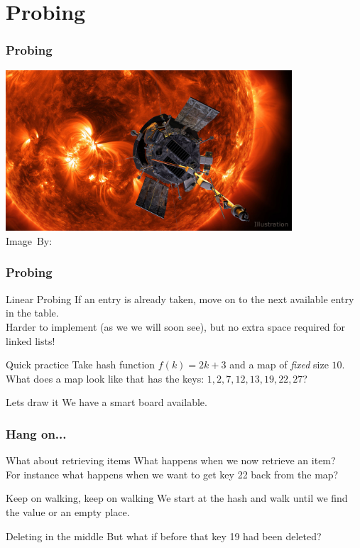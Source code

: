 \section{Probing}%
\label{sec:probing}

\begin{frame}
	\frametitle{Probing}
	\begin{center}
		\includegraphics[width=0.8\textwidth]{figures/probe.jpg}\\
		\hspace*{15pt}\hbox{\scriptsize Image By:}
	\end{center}
\end{frame}

\begin{frame}
	\frametitle{Probing}
		\begin{block}{Linear Probing}
			If an entry is already taken, move on to the next available entry in the table.\\
			Harder to implement (as we we will soon see), but no extra space required for linked lists!
		\end{block}	
		\pause
		\begin{questionblock}{Quick practice}
		  Take hash function $f(k) = 2k + 3$ and a map of \textit{fixed} size $10$. What does a map look like that has the
			keys: $1,2,7,12,13,19,22,27$?
		\end{questionblock}
		\pause
		\begin{answerblock}{Lets draw it}
			We have a smart board available.
		\end{answerblock}
\end{frame}

\begin{frame}
	\frametitle{Hang on...}

	\begin{questionblock}{What about retrieving items}
		What happens when we now retrieve an item?	\\
		For instance what happens when we want to get key 22 back from the map?
	\end{questionblock}
	\pause
	\begin{answerblock}{Keep on walking, keep on walking}
		We start at the hash and walk until we find the value or an \alert<3->{empty place}.
	\end{answerblock}
	\pause
	\begin{problemblock}{Deleting in the middle}	
		But what if before that key 19 had been deleted?
	\end{problemblock}
\end{frame}

